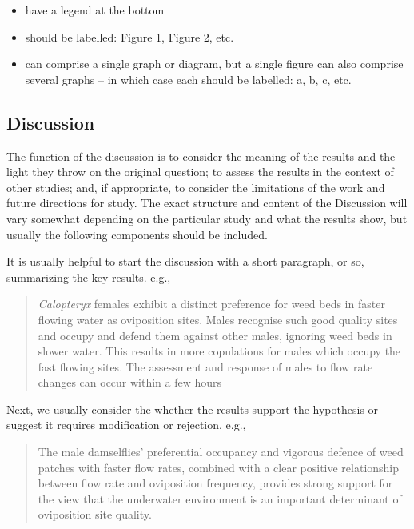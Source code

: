 \documentclass[
]{book}
\begin{document}
\begin{itemize}
\item
  have a legend at the bottom
\item
  should be labelled: Figure 1, Figure 2, etc.
\item
  can comprise a single graph or diagram, but a single figure can also comprise several graphs -- in which case each should be labelled: a, b, c, etc.
\end{itemize}

\hypertarget{discussion}{%
\subsection{Discussion}\label{discussion}}

The function of the discussion is to consider the meaning of the results and the light they throw on the original question; to assess the results in the context of other studies; and, if appropriate, to consider the limitations of the work and future directions for study. The exact structure and content of the Discussion will vary somewhat depending on the particular study and what the results show, but usually the following components should be included.

It is usually helpful to start the discussion with a short paragraph, or so, summarizing the key results. e.g.,

\begin{quote}
\emph{Calopteryx} females exhibit a distinct preference for weed beds in faster flowing water as oviposition sites. Males recognise such good quality sites and occupy and defend them against other males, ignoring weed beds in slower water. This results in more copulations for males which occupy the fast flowing sites. The assessment and response of males to flow rate changes can occur within a few hours
\end{quote}

Next, we usually consider the whether the results support the hypothesis or suggest it requires modification or rejection. e.g.,

\begin{quote}
The male damselflies' preferential occupancy and vigorous defence of weed patches with faster flow rates, combined with a clear positive relationship between flow rate and oviposition frequency, provides strong support for the view that the underwater environment is an important determinant of oviposition site quality.
\end{quote}
\end{document}
